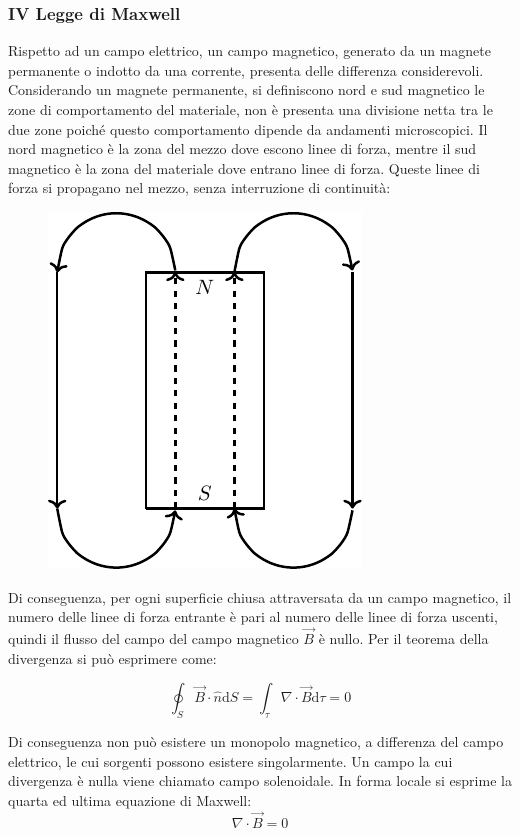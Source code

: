 \documentclass{article}
\newcommand{\df}{\mathrm{d}}
\numberwithin{equation}{subsection}
\begin{document}
\subsubsection{IV Legge di Maxwell}

Rispetto ad un campo elettrico, un campo magnetico, generato da un magnete permanente o indotto da una corrente, presenta delle differenza considerevoli. Considerando un 
magnete permanente, si definiscono nord e sud magnetico le zone di comportamento del materiale, non è presenta una divisione netta tra le due zone poiché questo comportamento 
dipende da andamenti microscopici. Il nord magnetico è la zona del mezzo dove escono linee di forza, mentre il 
sud magnetico è la zona del materiale dove entrano linee di forza. Queste linee di forza si propagano nel mezzo, senza interruzione di continuità:

\begin{figure}[H]%
    \centering
    \includegraphics{quarta-legge-maxwell.pdf}
    \label{fig:quarta-legge-maxwell}
\end{figure}

Di conseguenza, per ogni superficie chiusa attraversata da un campo magnetico, il numero delle linee di forza entrante è pari al numero delle linee di forza uscenti, quindi 
il flusso del campo del campo magnetico $\vec{B}$ è nullo. Per il teorema della divergenza si può esprimere come:

\begin{equation}
    \displaystyle\oint_{S}\vec{B}\cdot\hat{n}\df S=\int_{\tau}\nabla\cdot\vec{B}\df\tau=0
\end{equation}

Di conseguenza non può esistere un monopolo magnetico, a differenza del campo elettrico, le cui sorgenti possono esistere singolarmente. Un campo la cui divergenza è nulla 
viene chiamato campo solenoidale. In forma locale si esprime la quarta ed ultima equazione di Maxwell:
\begin{equation}
    \nabla\cdot\vec{B}=0
\end{equation}
\end{document}
